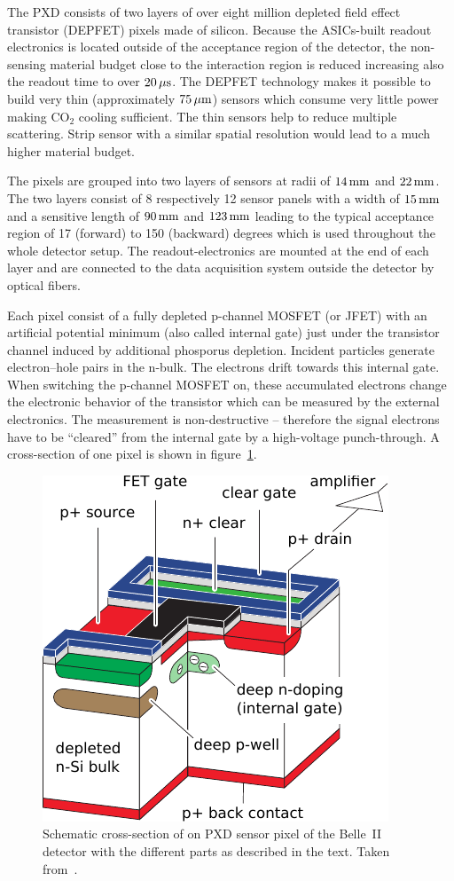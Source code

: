 The PXD consists of two layers of over eight million depleted field effect transistor (DEPFET) pixels made of silicon. Because the ASICs-built readout electronics is located outside of the acceptance region of the detector, the non-sensing material budget close to the interaction region is reduced increasing also the readout time to over $\unit[20]{\mu s}$. The DEPFET technology makes it possible to build very thin (approximately $\unit[75]{\mu m}$) sensors which consume very little power making $\mathrm{CO}_2$ cooling sufficient. The thin sensors help to reduce multiple scattering. Strip sensor with a similar spatial resolution would lead to a much higher material budget.

The pixels are grouped into two layers of sensors at radii of $\unit[14]{mm}$ and $\unit[22]{mm}$. The two layers consist of 8 respectively 12 sensor panels with a width of $\unit[15]{mm}$ and a sensitive length of $\unit[90]{mm}$ and $\unit[123]{mm}$ leading to the typical acceptance region of 17 (forward) to 150 (backward) degrees which is used throughout the whole detector setup. The readout-electronics are mounted at the end of each layer and are connected to the data acquisition system outside the detector by optical fibers.

Each pixel consist of a fully depleted p-channel MOSFET (or JFET) with an artificial potential minimum (also called internal gate) just under the transistor channel induced by additional phosporus depletion. Incident particles generate electron--hole pairs in the n-bulk. The electrons drift towards this internal gate. When switching the p-channel MOSFET on, these accumulated electrons change the electronic behavior of the transistor which can be measured by the external electronics. The measurement is non-destructive -- therefore the signal electrons have to be ``cleared'' from the internal gate by a high-voltage punch-through. A cross-section of one pixel is shown in figure~\ref{fig-pxd-schema}.

\begin{figure}
  \centering
  \includegraphics[width=0.6\linewidth]{figures/experimental_setup/pxd.pdf}
  \caption[Cross-section of a PXD sensor]{Schematic cross-section of on PXD sensor pixel of the Belle~II detector with the different parts as described in the text. Taken from~\cite{tdr}.}
  \label{fig-pxd-schema}
\end{figure}


